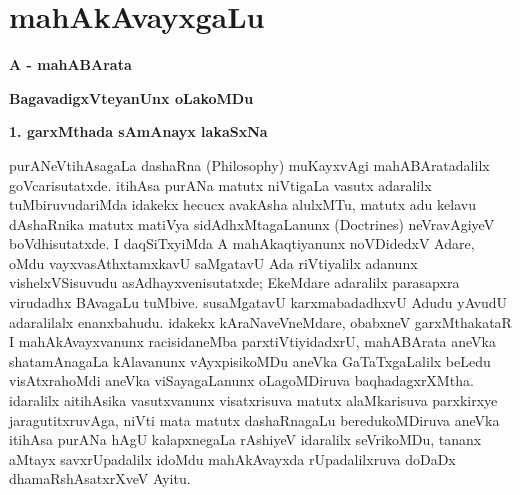 \makeatletter
\def\@makechapterhead#1{%
  \vspace*{10\p@}%
{\fontsize{13pt}{13pt}\selectfont\raggedright{\bf  sushiVlf kumArf DeV}\par}
\vspace*{25\p@}%
  {\parindent \z@ \centering \normalfont
    \ifnum \c@secnumdepth >\m@ne
      \if@mainmatter
        {\huge\bfseries  #1}\par\nobreak
	\vskip 4pt
      \fi
    \fi
\smallskip 

 \vskip 10\p@  
{\fontsize{12pt}{12pt}\selectfont\raggedleft{anu: \bf pu.ti.na.}\par}
  }
\vskip 40\p@}
\makeatother

\chapter{mahAkAvayxgaLu}\label{chap004}

\begin{center}
{\LARGE\bf A - mahABArata}

\medskip
{\LARGE\bf BagavadigxVteyanUnx oLakoMDu}
\end{center}

\begin{center}
{\Large\bf 1. garxMthada sAmAnayx lakaSxNa}
\end{center}

purANeVtihAsagaLa dashaRna {\rm(Philosophy)} muKayxvAgi mahABAratadalilx goVcarisutatxde. itihAsa purANa matutx niVtigaLa vasutx adaralilx tuMbiruvudariMda idakekx hecucx avakAsha alulxMTu, matutx adu kelavu dAshaRnika matutx matiVya sidAdhxMtagaLanunx {\rm(Doctrines)} neVravAgiyeV boVdhisutatxde. I daqSiTxyiMda A mahAkaqtiyanunx noVDidedxV Adare, oMdu vayxvasAthxtamxkavU saMgatavU Ada riVtiyalilx adanunx vishelxVSisuvudu asAdhayxvenisutatxde; EkeMdare adaralilx parasapxra virudadhx BAvagaLu tuMbive. susaMgatavU karxmabadadhxvU Adudu yAvudU adaralilalx enanxbahudu. idakekx kAraNaveVneMdare, obabxneV garxMthakataR I mahAkAvayxvanunx racisidaneMba parxtiVtiyidadxrU, mahABArata aneVka shatamAnagaLa kAlavanunx vAyxpisikoMDu aneVka GaTaTxgaLalilx beLedu visAtxrahoMdi aneVka viSayagaLanunx oLagoMDiruva baqhadagxrXMtha. idaralilx aitihAsika vasutxvanunx visatxrisuva matutx alaMkarisuva parxkirxye jaragutitxruvAga, niVti mata matutx dashaRnagaLu beredukoMDiruva aneVka itihAsa purANa hAgU kalapxnegaLa rAshiyeV idaralilx seVrikoMDu, tananx aMtayx savxrUpadalilx idoMdu mahAkAvayxda rUpadalilxruva doDaDx dhamaRshAsatxrXveV Ayitu.

